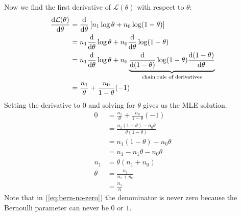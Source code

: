 Now we find the first derivative of $\mathcal L(\theta)$ with respect to $\theta$:
\begin{subequations}
\begin{align}
	\dv{\mathcal L(\theta)}{\theta} &= \dv{\theta} \left[ n_1 \log \theta + n_0 \log (1-\theta) \right] \\
	 &= n_1 \dv{\theta} \log \theta + n_0 \dv{\theta} \log (1-\theta) \\
	 &= n_1 \dv{\theta} \log \theta + n_0 \underbrace{\dv{(1-\theta)} \log (1-\theta) \dv{(1-\theta)}{\theta}}_{\text{chain rule of derivatives}}\\
	 &= \frac{n_1}{\theta} + \frac{n_0}{1-\theta}(-1) 
\end{align}
\end{subequations}
Setting the derivative to $0$ and solving for $\theta$ gives us the MLE solution.
\begin{subequations}
\begin{align}
	0 &= \frac{n_1}{\theta} + \frac{n_0}{1-\theta}(-1)\\	
	 &= \frac{n_1 (1 - \theta) - n_0 \theta}{\theta(1-\theta)} \label{eq:bern-no-zero}\\
	 &= n_1 (1 - \theta) - n_0 \theta\\
	 &= n_1 - n_1 \theta - n_0 \theta\\
	n_1 &= \theta(n_1 + n_0)\\
	\theta &= \frac{n_1}{n_1 + n_0}  \\
	&= \frac{n_1}{n}
\end{align}
\end{subequations}
Note that in (\ref{eq:bern-no-zero}) the denominator is never zero because the Bernoulli parameter can never be $0$ or $1$.